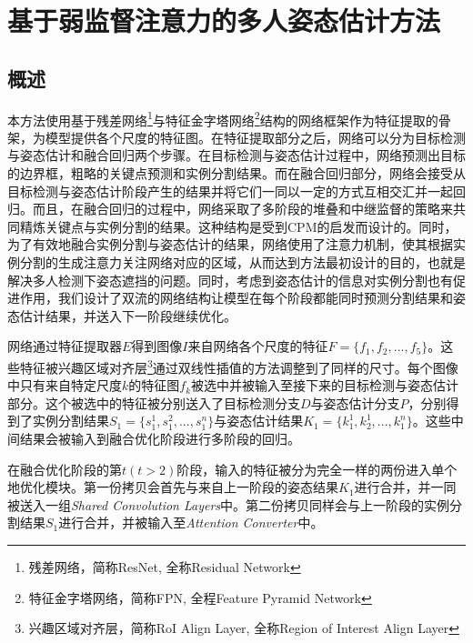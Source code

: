 \chapter{基于弱监督注意力的多人姿态估计方法}
\label{cha:method}

\section{概述}
\label{sec:methodoverview}
本方法使用基于残差网络\footnote{残差网络，简称ResNet, 全称Residual Network}与特征金字塔网络\footnote{特征金字塔网络，简称FPN, 全程Feature Pyramid Network}结构的网络框架作为特征提取的骨架，为模型提供各个尺度的特征图。在特征提取部分之后，网络可以分为目标检测与姿态估计和融合回归两个步骤。在目标检测与姿态估计过程中，网络预测出目标的边界框，粗略的关键点预测和实例分割结果。而在融合回归部分，网络会接受从目标检测与姿态估计阶段产生的结果并将它们一同以一定的方式互相交汇并一起回归。而且，在融合回归的过程中，网络采取了多阶段的堆叠和中继监督的策略来共同精炼关键点与实例分割的结果。这种结构是受到CPM\cite{wei2016convolutional}的启发而设计的。同时，为了有效地融合实例分割与姿态估计的结果，网络使用了注意力机制，使其根据实例分割的生成注意力关注网络对应的区域，从而达到方法最初设计的目的，也就是解决多人检测下姿态遮挡的问题。同时，考虑到姿态估计的信息对实例分割也有促进作用，我们设计了双流的网络结构让模型在每个阶段都能同时预测分割结果和姿态估计结果，并送入下一阶段继续优化。

网络通过特征提取器$E$得到图像$I$来自网络各个尺度的特征$F=\{f_1, f_2, ..., f_5\}$。这些特征被兴趣区域对齐层\footnote{兴趣区域对齐层，简称RoI Align Layer, 全称Region of Interest Align Layer}通过双线性插值的方法调整到了同样的尺寸。每个图像中只有来自特定尺度$k$的特征图$f_k$被选中并被输入至接下来的目标检测与姿态估计部分。这个被选中的特征被分别送入了目标检测分支$D$与姿态估计分支$P$，分别得到了实例分割结果$S_1=\{s_1^1, s_1^2, ..., s_1^n\}$与姿态估计结果$K_1=\{k_1^1, k_2^1, ..., k_1^n\}$。这些中间结果会被输入到融合优化阶段进行多阶段的回归。

在融合优化阶段的第$t(t>2)$阶段，输入的特征被分为完全一样的两份进入单个地优化模块。第一份拷贝会首先与来自上一阶段的姿态结果$K_1$进行合并，并一同被送入一组\textit{Shared Convolution Layers}中。第二份拷贝同样会与上一阶段的实例分割结果$S_1$进行合并，并被输入至\textit{Attention Converter}中。

